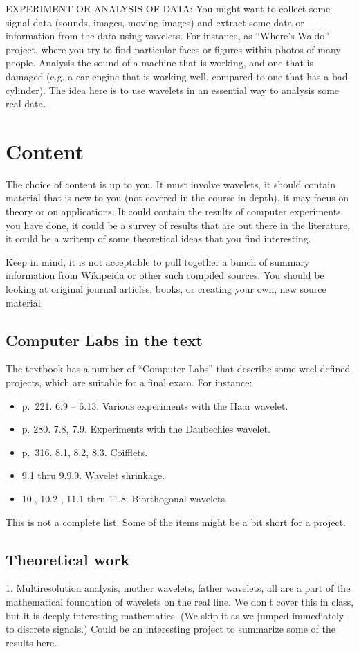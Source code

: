 \documentclass[12pt]{article}
\begin{document}
EXPERIMENT OR ANALYSIS OF DATA: You might want to collect some signal data (sounds, images, moving images) and extract some data or information from the data using wavelets. For instance, as ``Where's Waldo'' project, where you try to find particular faces or figures within photos of many people. Analysis the sound of a machine that is working, and one that is damaged (e.g. a car engine that is working well, compared to one that has a bad cylinder). The idea here is to use wavelets in an essential way to analysis some real data.

\section{Content}

The choice of content is up to you. It must involve wavelets, it should contain material that is new to you (not covered in the course in depth), it may focus on theory or on applications. It could contain the results of computer experiments you have done, it could be a survey of results that are out there in the literature, it could be a writeup of some theoretical ideas that you find interesting.

Keep in mind, it is not acceptable to pull together a bunch of summary information from Wikipeida or other such  compiled sources. You should be looking at original journal articles, books, or creating your own, new source material.

\subsection{Computer Labs in the text}
The textbook has a number of ``Computer Labs'' that describe some weel-defined projects, which are suitable for a final exam. For instance:
\begin{itemize}
\item p.\ 221. 6.9 -- 6.13. Various experiments with the Haar wavelet.
\item p. 280. 7.8, 7.9. Experiments with the Daubechies wavelet.
\item p.\ 316. 8.1, 8.2, 8.3. Coifflets. 
\item 9.1 thru 9.9.9. Wavelet shrinkage. 
\item 10., 10.2 , 11.1 thru 11.8. Biorthogonal wavelets.
\end{itemize}
This is not a complete list. Some of the items might be a bit short for a project.  

\subsection{Theoretical work}
1. Multiresolution analysis, mother wavelets, father wavelets, all are a part of the mathematical foundation of wavelets on the real line. We don't cover this in class, but it is deeply interesting mathematics. (We skip it as we jumped immediately to discrete signals.) Could be an interesting project to summarize some of the results here.
\end{document}

